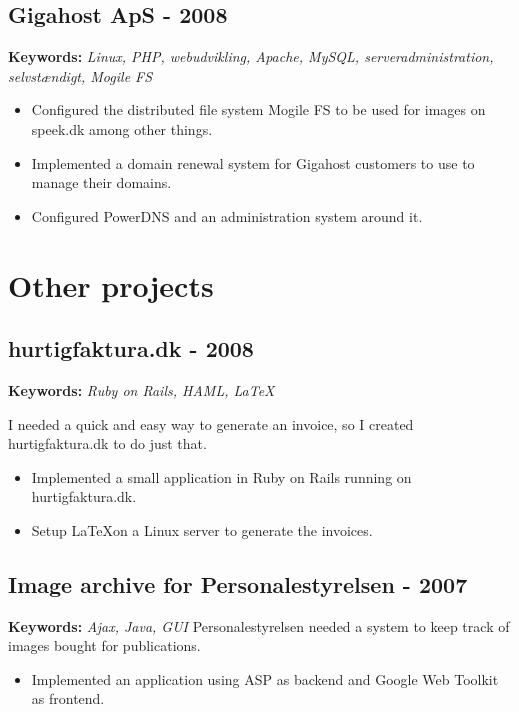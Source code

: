 \documentclass[a4paper]{article}
\newcommand{\keywords}[1]{\small\textbf{Keywords:} \emph{#1}\normalsize}
\begin{document}
\subsection*{Gigahost ApS - 2008}

\keywords{Linux, PHP, webudvikling, Apache, MySQL, serveradministration, selvstændigt, Mogile FS}

\begin{itemize}
	\item Configured the distributed file system Mogile FS to be used for images on speek.dk among other things.
	\item Implemented a domain renewal system for Gigahost customers to use to manage their domains.
	\item Configured PowerDNS and an administration system around it.
\end{itemize}

\section*{Other projects}

\subsection*{hurtigfaktura.dk - 2008}
\keywords{Ruby on Rails, HAML, \LaTeX}

I needed a quick and easy way to generate an invoice, so I created hurtigfaktura.dk to do just that.

\begin{itemize}
	\item Implemented a small application in Ruby on Rails running on hurtigfaktura.dk.
	\item Setup \LaTeX on a Linux server to generate the invoices.
\end{itemize}

\subsection*{Image archive for Personalestyrelsen - 2007} 
\keywords{Ajax, Java, GUI}
Personalestyrelsen needed a system to keep track of images bought for publications.

\begin{itemize}
	\item Implemented an application using ASP as backend and Google Web Toolkit as frontend.
\end{itemize}
\end{document}
